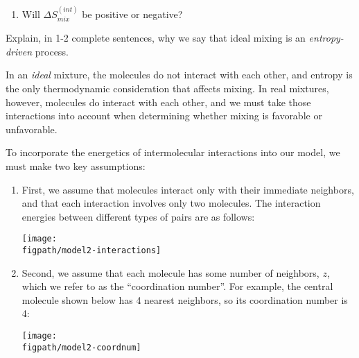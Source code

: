 \begin{activity}
\begin{ctqs}
\begin{enumerate}
				\begin{solution}[1in]
				\end{solution}
				
			\item Will $\Delta S_{mix}^{(int)}$ be positive or negative? \label{ctq:Spositive}
	
				\begin{solution}[1in]
				\end{solution}
				
		\end{enumerate}
		
	\question Explain, in 1-2 complete sentences, why we say that ideal mixing is an \emph{entropy-driven} process.
	
		\begin{solution}[1.5in]
		\end{solution}
		
\end{ctqs}
	

\begin{model}

In an \emph{ideal} mixture, the molecules do not interact with each other, and entropy is the only thermodynamic consideration that affects mixing.
In real mixtures, however, molecules do interact with each other, and we must take those interactions into account when determining whether mixing is favorable or unfavorable.

To incorporate the energetics of intermolecular interactions into our model, we must make two key assumptions:
\begin{enumerate}
	\item First, we assume that molecules interact only with their immediate neighbors, and that each interaction involves only two molecules.  The interaction energies between different types of pairs are as follows:

\centerline{\texttt{[image: \\figpath/model2-interactions]}}
	
	\item Second, we assume that each molecule has some number of neighbors, $z$, which we refer to as the ``coordination number''.  For example, the central molecule shown below has 4 nearest neighbors, so its coordination number is 4:

\centerline{\texttt{[image: \\figpath/model2-coordnum]}}



\end{enumerate}
\end{model}
\end{activity}
